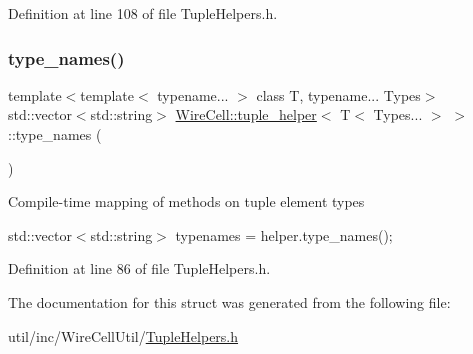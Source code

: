 Definition at line 108 of file Tuple\+Helpers.\+h.

\mbox{\label{struct_wire_cell_1_1tuple__helper_3_01_t_3_01_types_8_8_8_01_4_01_4_a55bdb6587f4f043ac4bb8f661d6c18f7}} 
\subsubsection{\texorpdfstring{type\+\_\+names()}{type\_names()}}
{\footnotesize\ttfamily template$<$template$<$ typename... $>$ class T, typename... Types$>$ \\
std\+::vector$<$std\+::string$>$ \hyperlink{struct_wire_cell_1_1tuple__helper}{Wire\+Cell\+::tuple\+\_\+helper}$<$ T$<$ Types... $>$ $>$\+::type\+\_\+names (\begin{DoxyParamCaption}{ }\end{DoxyParamCaption})\hspace{0.3cm}{\ttfamily [inline]}}

Compile-\/time mapping of methods on tuple element types

std\+::vector$<$std\+::string$>$ typenames = helper.\+type\+\_\+names(); 

Definition at line 86 of file Tuple\+Helpers.\+h.



The documentation for this struct was generated from the following file\+:\begin{DoxyCompactItemize}
\item 
util/inc/\+Wire\+Cell\+Util/\hyperlink{_tuple_helpers_8h}{Tuple\+Helpers.\+h}\end{DoxyCompactItemize}
